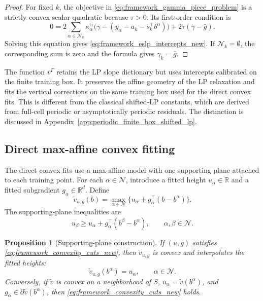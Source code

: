 \documentclass[11pt,letterpaper]{article}
\newtheorem{proposition}[theorem]{Proposition}
\theoremstyle{definition}
\theoremstyle{remark}
\begin{document}
\begin{proof}
For fixed $k$, the objective in \eqref{eq:framework_gamma_piece_problem} is a
strictly convex scalar quadratic because $\tau>0$. Its first-order condition is
$$
0
=
2\sum_{\alpha\in\mathcal N_k}
\kappa_\alpha^{\mathrm{tr}}
\bigl(\gamma-(y_\alpha-a_k-s_k^\top b^\alpha)\bigr)
+
2\tau(\gamma-\bar g).
$$
Solving this equation gives \eqref{eq:framework_eslp_intercepts_new}. If
$\mathcal N_k=\emptyset$, the corresponding sum is zero and the formula gives
$\gamma_k=\bar g$.
\end{proof}

The function $v^\Gamma$ retains the LP slope dictionary but uses intercepts
calibrated on the finite training box.
It preserves the affine geometry of the LP relaxation and fits the vertical
corrections on the same training box used for the direct convex fits. This is
different from the classical shifted-LP constants, which are derived from
full-cell periodic or asymptotically periodic residuals. The distinction is
discussed in Appendix~\ref{app:periodic_finite_box_shifted_lp}.

\subsection{Direct max-affine convex fitting } 
\label{subsec:framework_direct_fitting}

The direct convex fits use a max-affine model with one supporting plane
attached to each training point. For each $\alpha\in\mathcal N$, introduce a
fitted height $u_\alpha\in\mathbb R$ and a fitted subgradient
$g_\alpha\in\mathbb R^d$. Define
\begin{equation}
\label{eq:framework_max_affine_extension_new}
\widetilde v_{u,g}(b)
=
\max_{\alpha\in\mathcal N}
\{u_\alpha+g_\alpha^\top(b-b^\alpha)\}.
\end{equation}
The supporting-plane inequalities are
\begin{equation}
\label{eq:framework_convexity_cuts_new}
u_\beta
\ge
u_\alpha+g_\alpha^\top(b^\beta-b^\alpha),
\qquad
\alpha,\beta\in\mathcal N.
\end{equation}

\begin{proposition}[Supporting-plane construction]
\label{prop:supporting_plane_construction_framework}
If $(u,g)$ satisfies \eqref{eq:framework_convexity_cuts_new}, then
$\widetilde v_{u,g}$ is convex and interpolates the fitted heights:
$$
\widetilde v_{u,g}(b^\alpha)=u_\alpha,
\qquad
\alpha\in\mathcal N.
$$
Conversely, if $\widetilde v$ is convex on a neighborhood of $S$,
$u_\alpha=\widetilde v(b^\alpha)$, and
$g_\alpha\in\partial\widetilde v(b^\alpha)$, then
\eqref{eq:framework_convexity_cuts_new} holds.
\end{proposition}
\end{document}
